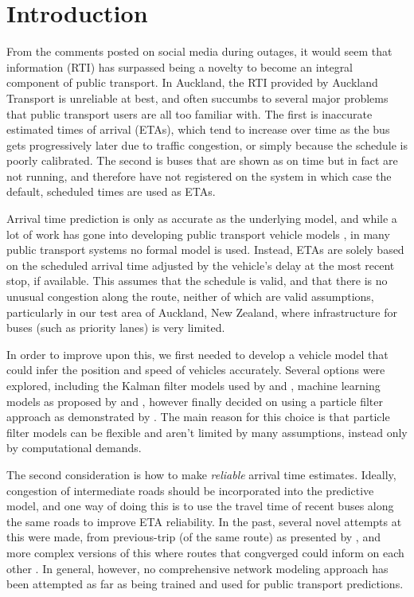 \section{Introduction}
\label{sec:intro}


From the comments posted on social media during outages,
it would seem that \rt information (RTI) has surpassed being a novelty
to become an integral component of public transport.
In Auckland, the RTI provided by Auckland Transport is unreliable at best,
and often succumbs to several major problems that public transport users
are all too familiar with.
The first is inaccurate estimated times of arrival (ETAs),
which tend to increase over time as the bus gets progressively later
due to traffic congestion, or simply because the schedule is poorly calibrated.
The second is buses that are shown as on time but in fact are not running,
and therefore have not registered on the \rt system in which case the default,
scheduled times are used as ETAs.


Arrival time prediction is only as accurate as the underlying model,
and while a lot of work has gone into developing public transport vehicle models
\citep{Cathey_2003,Jeong_2005,Yu_2011,Hans_2015},
in many public transport systems no formal model is used.
Instead, ETAs are solely based on the scheduled arrival time
adjusted by the vehicle's delay at the most recent stop, if available.
This assumes that the schedule is valid,
and that there is no unusual congestion along the route,
neither of which are valid assumptions,
particularly in our test area of Auckland, New Zealand,
where infrastructure for buses (such as priority lanes) is very limited.


In order to improve upon this, we first needed to develop a vehicle model
that could infer the position and speed of vehicles accurately.
Several options were explored, 
including the Kalman filter models used by \cite{Dailey_2001} and \cite{Cathey_2003},
machine learning models as proposed by \cite{Yu_2006} and \cite{Chang_2010},
however finally decided on using a particle filter approach as demonstrated
by \cite{Hans_2015}.
The main reason for this choice is that particle filter models can be 
flexible and aren't limited by many assumptions,
instead only by computational demands.


The second consideration is how to make \emph{reliable} arrival time estimates.
Ideally, congestion of intermediate roads should be incorporated into the predictive model,
and one way of doing this is to use the travel time of recent buses along
the same roads to improve ETA reliability.
In the past, several novel attempts at this were made,
from previous-trip (of the same route) as presented by \cite{Yu_2010},
and more complex versions of this where routes that congverged could
inform on each other \citep{Yu_2011}.
In general, however, no comprehensive network modeling approach has been attempted
as far as being trained and used for public transport predictions.


